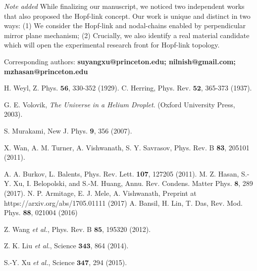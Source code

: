 \documentclass[aps,prl,superscriptaddress,twocolumn,showpacs]{revtex4-1}
\begin{document}
\bigskip
\textit{Note added} While finalizing our manuscript, we noticed two independent works \cite{Hopf1, Hopf2} that also proposed the Hopf-link concept. Our work is unique and distinct in two ways: (1) We consider the Hopf-link and nodal-chains enabled by perpendicular mirror plane mechanism; (2) Crucially, we also identify a real material candidate which will open the experimental research front for Hopf-link topology.

Corresponding authors:
\textbf{suyangxu@princeton.edu;
nilnish@gmail.com;
mzhasan@princeton.edu
}

\begin{thebibliography}{99}



 H. Weyl,   Z. Phys. $\mathbf{56}$, 330-352 (1929).
 C. Herring,   Phys. Rev. $\mathbf{52}$, 365-373 (1937).


 G. E. Volovik,  \textit{The Universe in a Helium Droplet}. (Oxford University Press, 2003).


 S. Murakami,  New J. Phys. \textbf{9}, 356 (2007).

 X. Wan, A. M. Turner, A. Vishwanath, S. Y. Savrasov, Phys. Rev. B \textbf{83}, 205101 (2011).

 A. A. Burkov, L. Balents, Phys. Rev. Lett. \textbf{107}, 127205 (2011).
 M. Z. Hasan, S.-Y. Xu, I. Belopolski, and S.-M. Huang, Annu. Rev.  Condens. Matter Phys. $\mathbf{8}$, 289 (2017).
 N. P. Armitage, E. J. Mele, A. Vishwanath, Preprint at https://arxiv.org/abs/1705.01111 (2017)
 A. Bansil, H. Lin, T. Das, Rev. Mod. Phys. \textbf{88}, 021004 (2016)

 Z. Wang \textit{et al.}, Phys. Rev. B $\mathbf{85}$, 195320 (2012).


 Z. K. Liu \textit{et al.}, Science $\mathbf{343}$, 864 (2014).


 S.-Y. Xu \textit{et al.}, Science $\mathbf{347}$, 294 (2015).


\end{thebibliography}
\end{document}
